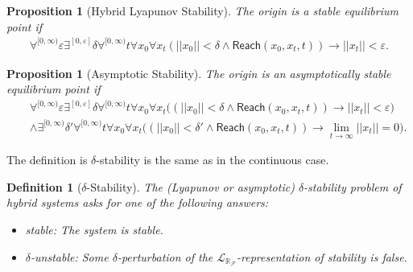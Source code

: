 \documentclass[10pt]{article}
\theoremstyle{plain}
\newtheorem{proposition}[theorem]{Proposition}
\newtheorem{definition}[theorem]{Definition}
\theoremstyle{definition}
\newcommand{\reach}{\mathsf{Reach}}
\newcommand{\lrf}{\mathcal{L}_{\mathbb{R}_{\mathcal{F}}}}
\begin{document}
\begin{proposition}[Hybrid Lyapunov Stability]
The origin is a stable equilibrium point if 
\begin{eqnarray*}
\forall^{[0,\infty)} \varepsilon\exists^{[0,\varepsilon]} \delta \forall^{[0,\infty)} t\forall x_0\forall x_t (||x_0||<\delta \wedge \reach(x_0,x_t,t) )\rightarrow ||x_t||<\varepsilon.
\end{eqnarray*}
\end{proposition}
\begin{proposition}[Asymptotic Stability]
The origin is an asymptotically stable equilibrium point if 
\begin{eqnarray*}
& &\forall^{[0,\infty)} \varepsilon\exists^{[0,\varepsilon]} \delta\forall^{[0,\infty)} t\forall x_0\forall x_t\Big((||x_0||<\delta \wedge \reach(x_0,x_t,t) )\rightarrow ||x_t||<\varepsilon\Big)\\
& &\wedge \exists^{[0,\infty)} \delta'  \forall^{[0,\infty)} t\forall x_0\forall x_t\Big( (||x_0||<\delta'\wedge \reach(x_0,x_t,t))\rightarrow \lim_{t\rightarrow \infty} ||x_t|| = 0\Big). 
\end{eqnarray*}
\end{proposition}
The definition is $\delta$-stability is the same as in the continuous case. 
\begin{definition}[$\delta$-Stability]\label{sl}
The (Lyapunov or asymptotic) $\delta$-stability problem of hybrid systems asks for one of the following answers:
\begin{itemize}
\item {\sf stable}: The system is stable. 
\item {\sf $\delta$-unstable}: Some $\delta$-perturbation of the $\lrf$-representation of stability is false. 
\end{itemize}
\end{definition}
\end{document}
